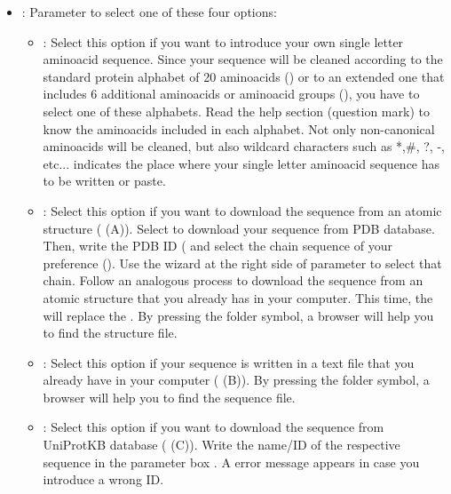 \begin{itemize}
\begin{itemize}
  \begin{itemize}
  \item {}: Parameter to select one of these four options:\\
   \begin{itemize}
   \item {}: Select this option if you want to introduce your own single letter aminoacid sequence. Since your sequence will be cleaned according to the standard protein alphabet of 20 aminoacids () or to an extended one that includes 6 additional aminoacids or aminoacid groups (), you have to select one of these  alphabets. Read the help section (question mark) to know the aminoacids included in each alphabet. Not only non-canonical aminoacids will be cleaned, but also wildcard characters such as *,\#, ?, -, etc...  indicates the place where your single letter aminoacid sequence has to be written or paste.\\ 
   \item {}: Select this option if you want to download the sequence from an atomic structure ( (A)). Select  to download your sequence from PDB database. Then, write the PDB ID ( and select the chain sequence of your preference (). Use the wizard at the right side of  parameter to select that chain. Follow an analogous process to download the sequence from an atomic structure that you already has in your computer. This time, the  will replace the . By pressing the folder symbol, a browser will help you to find the structure file.\\
   \item {}: Select this option if your sequence is written in a text file that you already have in your computer ( (B)). By pressing the folder symbol, a browser will help you to find the sequence file.\\
   \item {}: Select this option if you want to download the sequence from UniProtKB database ( (C)). Write the name/ID of the respective sequence in the parameter box . A error message appears in case you introduce a wrong ID.\\
   

\end{itemize}
\end{itemize}
\end{itemize}
\end{itemize}
